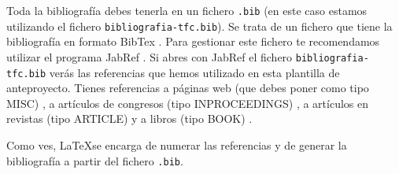 \documentclass[12pt,oneside,a4paper]{article}
\begin{document}





Toda la bibliografía debes tenerla en un fichero \verb$.bib$ (en este caso estamos utilizando el fichero \verb$bibliografia-tfc.bib$). Se trata de un fichero que tiene la bibliografía en formato BibTex \cite{bibtex}. Para gestionar este fichero te recomendamos utilizar el programa JabRef \cite{jabref}. Si abres con JabRef el fichero \verb$bibliografia-tfc.bib$ verás las referencias que hemos utilizado en esta plantilla de anteproyecto. Tienes referencias a páginas web (que debes poner como tipo MISC) \cite{bibtex,jabref,wikibook}, a artículos de congresos (tipo INPROCEEDINGS) \cite{Lowe1999}, a artículos en revistas (tipo ARTICLE) \cite{Tuytelaars2008} y a libros (tipo BOOK) \cite{hartley2006}.

Como ves, \LaTeX se encarga de numerar las referencias y de generar la bibliografía a partir del fichero \verb$.bib$.






\end{document}
